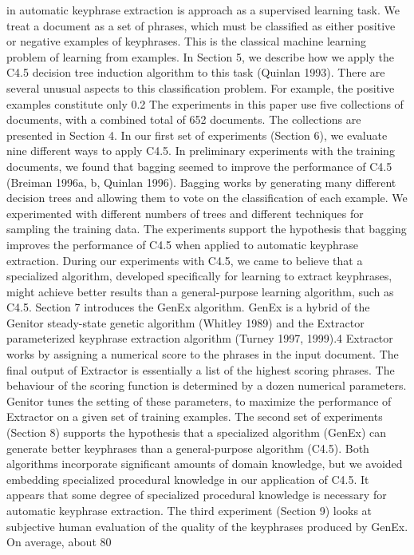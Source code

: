 in \cite{turney2000}  automatic keyphrase extraction is approach as a supervised learning task. We treat a document as a set of phrases, which must be classified as either positive or negative examples 
of keyphrases. This is the classical machine learning problem of learning from examples. In Section 5, we describe how we apply the C4.5 decision tree induction algorithm to this task (Quinlan 1993). There are several unusual aspects to this classification problem. For example, the positive examples constitute only 0.2%
The experiments in this paper use five collections of documents, with a combined total of 652 documents. The collections are presented in Section 4. In our first set of experiments (Section 6), we evaluate nine different ways to apply C4.5. In preliminary experiments with the training documents, we found that bagging seemed to improve the performance of C4.5 (Breiman 1996a, b, Quinlan 1996). Bagging works by generating many different decision trees and allowing them to vote on the classification of each example. We experimented with different numbers of trees and different techniques for sampling the training data. The experiments support the hypothesis that bagging improves the performance of C4.5 when applied to automatic keyphrase extraction.
During our experiments with C4.5, we came to believe that a specialized algorithm, developed specifically for learning to extract keyphrases, might achieve better results than a general-purpose learning algorithm, such as C4.5. Section 7 introduces the GenEx algorithm. GenEx is a hybrid of the Genitor steady-state genetic algorithm (Whitley 1989) and the Extractor parameterized keyphrase extraction algorithm (Turney 1997, 1999).4 Extractor works by assigning a numerical score to the phrases in the input document. The final output of Extractor is essentially a list of the highest scoring phrases. The behaviour of the scoring function is determined by a dozen numerical parameters. Genitor tunes the setting of these parameters, to maximize the performance of Extractor on a given set of training examples.
The second set of experiments (Section 8) supports the hypothesis that a specialized algorithm (GenEx) can generate better keyphrases than a general-purpose algorithm (C4.5). Both algorithms incorporate significant amounts of domain knowledge, but we avoided embedding specialized procedural knowledge in our application of C4.5. It appears that some degree of specialized procedural knowledge is necessary for automatic keyphrase extraction.
The third experiment (Section 9) looks at subjective human evaluation of the quality of the keyphrases produced by GenEx. On average, about 80%

